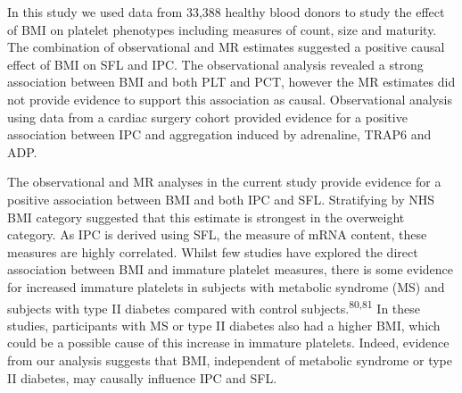 \documentclass[11pt,twoside]{bristolthesis}
\begin{document}
In this study we used data from 33,388 healthy blood donors to study the effect of BMI on platelet phenotypes including measures of count, size and maturity. The combination of observational and MR estimates suggested a positive causal effect of BMI on SFL and IPC. The observational analysis revealed a strong association between BMI and both PLT and PCT, however the MR estimates did not provide evidence to support this association as causal. Observational analysis using data from a cardiac surgery cohort provided evidence for a positive association between IPC and aggregation induced by adrenaline, TRAP6 and ADP.

The observational and MR analyses in the current study provide evidence for a positive association between BMI and both IPC and SFL. Stratifying by NHS BMI category suggested that this estimate is strongest in the overweight category. As IPC is derived using SFL, the measure of mRNA content, these measures are highly correlated. Whilst few studies have explored the direct association between BMI and immature platelet measures, there is some evidence for increased immature platelets in subjects with metabolic syndrome (MS) and subjects with type II diabetes compared with control subjects.\textsuperscript{80,81} In these studies, participants with MS or type II diabetes also had a higher BMI, which could be a possible cause of this increase in immature platelets. Indeed, evidence from our analysis suggests that BMI, independent of metabolic syndrome or type II diabetes, may causally influence IPC and SFL.
\end{document}
